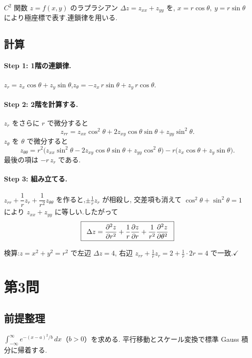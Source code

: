 \documentclass[11pt,a4paper]{article}
\begin{document}
$C^2$ 関数 $z=f(x,y)$ のラプラシアン $\Delta z=z_{xx}+z_{yy}$ を,
$x=r\cos\theta,\ y=r\sin\theta$ により極座標で表す.連鎖律を用いる.

\subsection*{計算}

\paragraph{Step 1: 1階の連鎖律.}
$z_r=z_x\cos\theta+z_y\sin\theta$,$z_\theta=-z_x\,r\sin\theta+z_y\,r\cos\theta$.

\paragraph{Step 2: 2階を計算する.}
$z_r$ をさらに $r$ で微分すると
\[
z_{rr}=z_{xx}\cos^2\theta+2z_{xy}\cos\theta\sin\theta+z_{yy}\sin^2\theta.
\]
$z_\theta$ を $\theta$ で微分すると
\[
z_{\theta\theta}=r^2\bigl(z_{xx}\sin^2\theta-2z_{xy}\cos\theta\sin\theta+z_{yy}\cos^2\theta\bigr)
-r\bigl(z_x\cos\theta+z_y\sin\theta\bigr).
\]
最後の項は $-r\,z_r$ である.

\paragraph{Step 3: 組み立てる.}
$z_{rr}+\dfrac1r z_r+\dfrac1{r^2}z_{\theta\theta}$ を作ると,$\pm\frac1r z_r$ が相殺し,
交差項も消えて $\cos^2\theta+\sin^2\theta=1$ により $z_{xx}+z_{yy}$ に等しい.したがって
\[
\boxed{\,\
\Delta z=\frac{\partial^2 z}{\partial r^2}+\frac1r\frac{\partial z}{\partial r}
+\frac1{r^2}\frac{\partial^2 z}{\partial\theta^2}\ \,}
\]

検算:$z=x^2+y^2=r^2$ で左辺 $\Delta z=4$,
右辺 $z_{rr}+\frac1r z_r=2+\frac1r\cdot2r=4$ で一致.$\checkmark$

\section*{第3問}

\subsection*{前提整理}

$\displaystyle\int_{-\infty}^{\infty}e^{-(x-a)^2/b}\,dx$（$b>0$）を求める.
平行移動とスケール変換で標準 Gauss 積分に帰着する.
\end{document}
